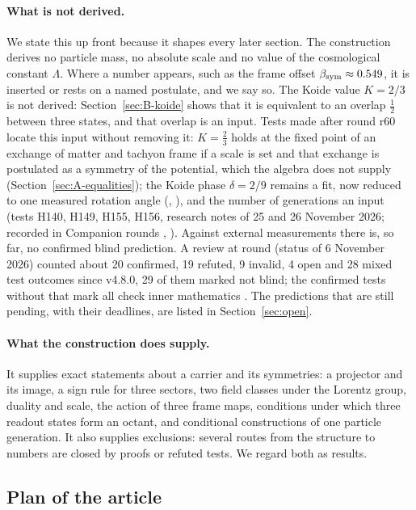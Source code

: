 \paragraph{What is not derived.}
We state this up front because it shapes every later section. The construction derives no particle
mass, no absolute scale and no value of the cosmological constant $\Lambda$. Where a number appears,
such as the frame offset $\beta_{\mathrm{sym}}\approx0.549$, it is inserted or rests on a named postulate, and we say so. The Koide value $K=2/3$
is not derived: Section~\ref{sec:B-koide} shows that it is equivalent to an overlap $\tfrac12$ between three states,
and that overlap is an input. Tests made after round r60 locate this input without removing it: $K=\tfrac23$ holds at the
fixed point of an exchange of matter and tachyon frame if a scale is set and that exchange is postulated as a symmetry of the
potential, which the algebra does not supply (Section~\ref{sec:A-equalities}); the Koide phase $\delta=2/9$ remains a fit, now reduced to one measured rotation angle (, ), and the number of generations
an input (tests H140, H149, H155, H156, research notes of 25 and 26 November 2026; recorded in Companion rounds , ). Against
external measurements there is, so far, no confirmed blind prediction. A review at round  (status of 6 November 2026) counted about 20 confirmed, 19 refuted, 9 invalid, 4 open and
28 mixed test outcomes since v4.8.0, 29 of them marked not blind; the confirmed tests without that
mark all check inner mathematics \cite{QSC}. The predictions that are still pending, with their
deadlines, are listed in Section~\ref{sec:open}.

\paragraph{What the construction does supply.}
It supplies exact statements about a carrier and its symmetries: a projector and its image, a sign
rule for three sectors, two field classes under the Lorentz group, duality and scale, the action of
three frame maps, conditions under which three readout states form an octant, and conditional
constructions of one particle generation. It also supplies exclusions: several routes from the
structure to numbers are closed by proofs or refuted tests. We regard both as results.



\subsection{Plan of the article}
\label{sec:A-plan}

